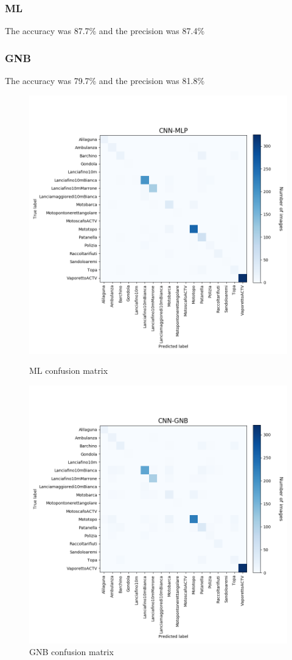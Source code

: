 \documentclass[12pt]{article}
\begin{document}
\subsubsection{ML}
The accuracy was 87.7\% and the precision was 87.4\%
\subsubsection{GNB}
The accuracy was 79.7\% and the precision was 81.8\%

\begin{figure}[!ht]
	\centering
	\begin{minipage}{.5\textwidth}
		\centering
		\includegraphics[width=.8\linewidth]{../code/output/CNN-MLP.png}
		\caption{ML confusion matrix} %
		\label{fig:cnf_mlp}
	\end{minipage}%
	\begin{minipage}{.5\textwidth}
		\centering
		\includegraphics[width=.8\linewidth]{../code/output/CNN-GNB.png}
		\caption{GNB confusion matrix} %
		\label{fig:cnf_gnb}
	\end{minipage}
\end{figure}
\end{document}

